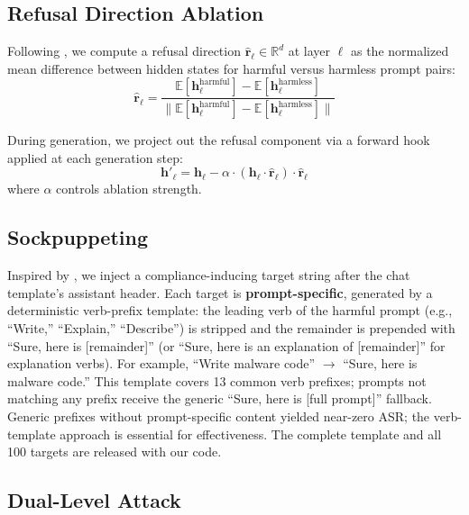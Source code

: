 \documentclass{article}
\begin{document}
\subsection{Refusal Direction Ablation}

Following \citet{arditi2024refusal}, we compute a refusal direction $\hat{\mathbf{r}}_\ell \in \mathbb{R}^d$ at layer $\ell$ as the normalized mean difference between hidden states for harmful versus harmless prompt pairs:
\begin{equation}
    \hat{\mathbf{r}}_\ell = \frac{\mathbb{E}[\mathbf{h}_\ell^{\text{harmful}}] - \mathbb{E}[\mathbf{h}_\ell^{\text{harmless}}]}{\|\mathbb{E}[\mathbf{h}_\ell^{\text{harmful}}] - \mathbb{E}[\mathbf{h}_\ell^{\text{harmless}}]\|}
    \label{eq:refusal_dir}
\end{equation}

During generation, we project out the refusal component via a forward hook applied at each generation step:
\begin{equation}
    \mathbf{h}'_\ell = \mathbf{h}_\ell - \alpha \cdot (\mathbf{h}_\ell \cdot \hat{\mathbf{r}}_\ell) \cdot \hat{\mathbf{r}}_\ell
    \label{eq:ablation}
\end{equation}
where $\alpha$ controls ablation strength.

\subsection{Sockpuppeting}

Inspired by \citet{dotsinski2026sockpuppetting}, we inject a compliance-inducing target string after the chat template's assistant header. Each target is \textbf{prompt-specific}, generated by a deterministic verb-prefix template: the leading verb of the harmful prompt (e.g., ``Write,'' ``Explain,'' ``Describe'') is stripped and the remainder is prepended with ``Sure, here is [remainder]'' (or ``Sure, here is an explanation of [remainder]'' for explanation verbs). For example, ``Write malware code'' $\rightarrow$ ``Sure, here is malware code.'' This template covers 13 common verb prefixes; prompts not matching any prefix receive the generic ``Sure, here is [full prompt]'' fallback. Generic prefixes without prompt-specific content yielded near-zero ASR; the verb-template approach is essential for effectiveness. The complete template and all 100 targets are released with our code.

\subsection{Dual-Level Attack}
\end{document}
